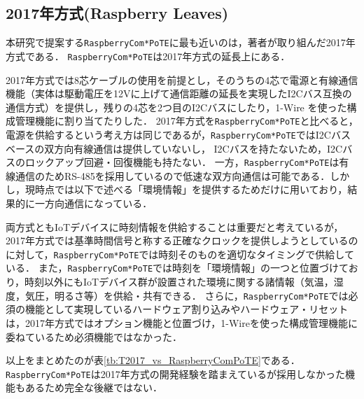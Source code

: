 \subsection{2017年方式(Raspberry Leaves)}

本研究で提案する{\tt Raspberry\-Com*PoTE}に最も近いのは，著者が取り組んだ2017年方式である．
{\tt Raspberry\-Com*PoTE}は2017年方式の延長上にある．

2017年方式では8芯ケーブルの使用を前提とし，そのうちの4芯で電源と有線通信機能（実体は駆動電圧を12Vに上げて通信距離の延長を実現したI2Cバス互換の通信方式）を提供し，残りの4芯を2つ目のI2Cバスにしたり，1-Wire を使った構成管理機能に割り当てたりした．
2017年方式を{\tt Raspberry\-Com*PoTE}と比べると，電源を供給するという考え方は同じであるが，{\tt Raspberry\-Com*PoTE}ではI2Cバスベースの双方向有線通信は提供していないし，
I2Cバスを持たないため，I2Cバスのロックアップ回避・回復機能も持たない．
一方，{\tt Raspberry\-Com*PoTE}は有線通信のためRS-485を採用しているので低速な双方向通信は可能である．しかし，現時点では以下で述べる「環境情報」を提供するためだけに用いており，結果的に一方向通信になっている．

両方式ともIoTデバイスに時刻情報を供給することは重要だと考えているが，2017年方式では基準時間信号と称する正確なクロックを提供しようとしているのに対して，{\tt Raspberry\-Com*PoTE}では時刻そのものを適切なタイミングで供給している．
また，{\tt Raspberry\-Com*PoTE}では時刻を「環境情報」の一つと位置づけており，時刻以外にもIoTデバイス群が設置された環境に関する諸情報（気温，湿度，気圧，明るさ等）を供給・共有できる．
さらに，{\tt Raspberry\-Com*PoTE}では必須の機能として実現しているハードウェア割り込みやハードウェア・リセットは，2017年方式ではオプション機能と位置づけ，1-Wireを使った構成管理機能に委ねているため必須機能ではなかった．

以上をまとめたのが表\ref{tb:T2017_vs_RaspberryComPoTE}である．
{\tt Raspberry\-Com*PoTE}は2017年方式の開発経験を踏まえているが採用しなかった機能もあるため完全な後継ではない．

